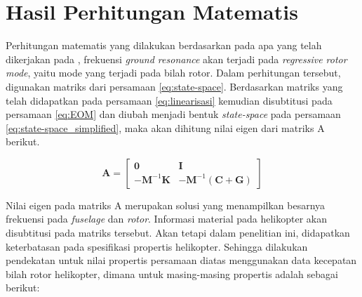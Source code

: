 \section{Hasil Perhitungan Matematis}

Perhitungan matematis yang dilakukan berdasarkan pada apa yang telah dikerjakan pada \cite{BERGEOT201672}, frekuensi \textit{ground resonance} akan terjadi pada \textit{regressive rotor mode}, yaitu mode yang terjadi pada bilah rotor. Dalam perhitungan tersebut, digunakan matriks dari persamaan \ref{eq:state-space}. Berdasarkan matriks yang telah didapatkan pada persamaan \ref{eq:linearisasi} kemudian disubtitusi pada persamaan \ref{eq:EOM} dan diubah menjadi bentuk \textit{state-space} pada persamaan \ref{eq:state-space_simplified}, maka akan dihitung nilai eigen dari matriks A berikut.

\begin{equation}
	\mathbf{A}=\begin{bmatrix}
	\mathbf{0}& \mathbf{I}\\
	\mathbf{-M}^{-1}\mathbf{K}& \mathbf{-M}^{-1}(\mathbf{C}+\mathbf{G})
	\end{bmatrix}
\end{equation}

Nilai eigen pada matriks A merupakan solusi yang menampilkan besarnya frekuensi pada \textit{fuselage} dan \textit{rotor}. Informasi material pada helikopter akan disubtitusi pada matriks tersebut. Akan tetapi dalam penelitian ini, didapatkan keterbatasan pada spesifikasi propertis helikopter. Sehingga dilakukan pendekatan untuk nilai propertis persamaan diatas menggunakan data kecepatan bilah rotor helikopter, dimana untuk masing-masing propertis adalah sebagai berikut:

\begin{table}[h]
	\centering
	\caption{Pendekatan nilai propertis helikopter.}
	\label{tb:propertis}
\end{table}

